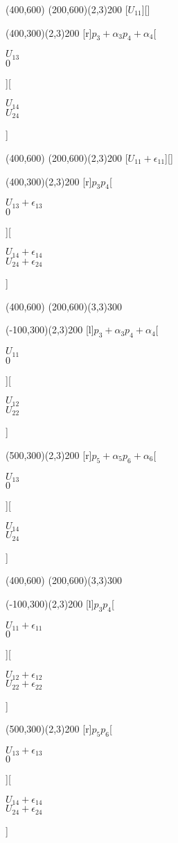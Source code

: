 \documentclass[11pt]{article}
\begin{document}
\newcommand{\pb}[1]{\parbox{1in}{\centering #1}}

\begin{center}
\begin{egame}(400,600)
  \putbranch(200,600)(2,3){200}
  [$U_{11}$][]

  \putbranch(400,300)(2,3){200}
  [r]{$p_3 + \alpha_3$}{$p_4 + \alpha_4$}[\pb{$U_{13}$ \\ $0$}][\pb{$U_{14}$ \\ $U_{24}$}]
\end{egame}
\end{center}

\newpage

\begin{center}
\begin{egame}(400,600)
  \putbranch(200,600)(2,3){200}
  [$U_{11} + \epsilon_{11}$][]

  \putbranch(400,300)(2,3){200}
  [r]{$p_3$}{$p_4$}[\pb{$U_{13} + \epsilon_{13}$ \\ $0$}][\pb{$U_{14} + \epsilon_{14}$ \\ $U_{24} + \epsilon_{24}$}]
\end{egame}
\end{center}

\newpage

\begin{center}
\begin{egame}(400,600)
  \putbranch(200,600)(3,3){300}
  
  \putbranch(-100,300)(2,3){200}
  [l]{$p_3 + \alpha_3$}{$p_4 + \alpha_4$}[\pb{$U_{11}$ \\ $0$}][\pb{$U_{12}$ \\ $U_{22}$}]

  \putbranch(500,300)(2,3){200}
  [r]{$p_5 + \alpha_5$}{$p_6 + \alpha_6$}[\pb{$U_{13}$ \\ $0$}][\pb{$U_{14}$ \\ $U_{24}$}]
\end{egame}
\end{center}

\newpage

\begin{center}
\begin{egame}(400,600)
  \putbranch(200,600)(3,3){300}
  
  \putbranch(-100,300)(2,3){200}
  [l]{$p_3$}{$p_4$}[\pb{$U_{11} + \epsilon_{11}$ \\ $0$}][\pb{$U_{12} + \epsilon_{12}$ \\ $U_{22} + \epsilon_{22}$}]

  \putbranch(500,300)(2,3){200}
  [r]{$p_5$}{$p_6$}[\pb{$U_{13} + \epsilon_{13}$ \\ $0$}][\pb{$U_{14} + \epsilon_{14}$ \\ $U_{24} + \epsilon_{24}$}]
\end{egame}
\end{center}
\end{document}
